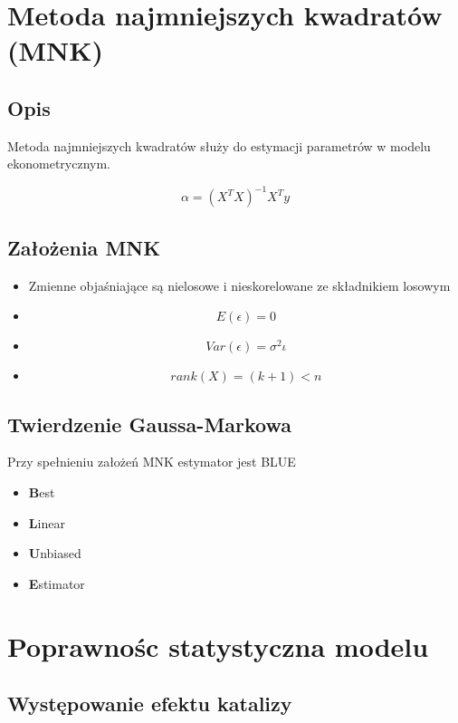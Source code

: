 \section{Metoda najmniejszych kwadratów (MNK)}\label{sec:mnk}

\subsection{Opis}\label{subsec:opis}
Metoda najmniejszych kwadratów służy do estymacji parametrów w modelu ekonometrycznym.

\[ \alpha = (X^{T}X)^{-1}X^{T}y \]

\subsection{Założenia MNK}\label{subsec:założenia-mnk}

\begin{itemize}
    \item Zmienne objaśniające są nielosowe i nieskorelowane ze składnikiem losowym
    \item \[E(\epsilon) = 0\]
    \item \[Var(\epsilon) = \sigma^2 \iota\]
    \item \[rank(X) = (k+1) <n\]
\end{itemize}

\subsection{Twierdzenie Gaussa-Markowa}\label{subsec:twierdzenie-gaussa-markowa}
Przy spełnieniu założeń MNK estymator jest BLUE
\begin{itemize}
    \item \textbf{B}est
    \item \textbf{L}inear
    \item \textbf{U}nbiased
    \item \textbf{E}stimator
\end{itemize}

\section {Poprawnośc statystyczna modelu}\label{sec:testy-statystyczne-modelu}

\subsection{Występowanie efektu katalizy}\label{subsec:występowanie-efektu-katalizy}

